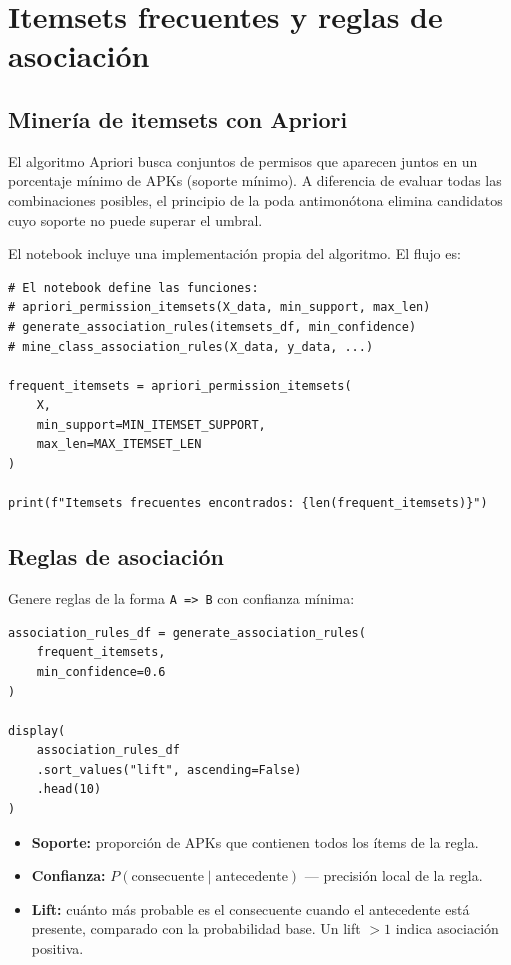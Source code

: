 \documentclass[
  coursetitle={Cómputo Nube y Tecnologías Emergentes},
  coursehours={96},
  coursedate={Verano 2026},
  doctype={Tutorial},
  otherlangs={english,french},
  authorname={Lázaro},
  authorsurname={Bustio-Martínez},
  authortitle={PhD},
  role={Profesor Investigador},
  email={lbustio@inaoe.mx},
  phone={5559504000},
  ext={7459},
  institution={Instituto Nacional de Astrofísica, Óptica y Electrónica (INAOE)},
  department={Maestría en Ciencias en Tecnologías de Seguridad},
  address={Luis Enrique Erro 1, Sta. Ma. Tonantzintla, San Andrés Cholula, CP 72840, Puebla, México},
  margin={0.5in}
]{../../lbustio_lecture_notes}
\begin{document}
\section{Itemsets frecuentes y reglas de asociación}

\subsection{Minería de itemsets con Apriori}

El algoritmo Apriori busca conjuntos de permisos que aparecen juntos en un porcentaje mínimo de APKs (soporte mínimo). A diferencia de evaluar todas las combinaciones posibles, el principio de la poda antimonótona elimina candidatos cuyo soporte no puede superar el umbral.

El notebook incluye una implementación propia del algoritmo. El flujo es:

\begin{lstlisting}
# El notebook define las funciones:
# apriori_permission_itemsets(X_data, min_support, max_len)
# generate_association_rules(itemsets_df, min_confidence)
# mine_class_association_rules(X_data, y_data, ...)

frequent_itemsets = apriori_permission_itemsets(
    X,
    min_support=MIN_ITEMSET_SUPPORT,
    max_len=MAX_ITEMSET_LEN
)

print(f"Itemsets frecuentes encontrados: {len(frequent_itemsets)}")
\end{lstlisting}

\subsection{Reglas de asociación}

Genere reglas de la forma \texttt{A => B} con confianza mínima:

\begin{lstlisting}
association_rules_df = generate_association_rules(
    frequent_itemsets,
    min_confidence=0.6
)

display(
    association_rules_df
    .sort_values("lift", ascending=False)
    .head(10)
)
\end{lstlisting}

\begin{tcolorbox}[title=Métricas de las reglas]
\begin{itemize}
    \item \textbf{Soporte:} proporción de APKs que contienen todos los ítems de la regla.
    \item \textbf{Confianza:} $P(\text{consecuente} \mid \text{antecedente})$ --- precisión local de la regla.
    \item \textbf{Lift:} cuánto más probable es el consecuente cuando el antecedente está presente, comparado con la probabilidad base. Un lift $> 1$ indica asociación positiva.
\end{itemize}
\end{tcolorbox}
\end{document}
